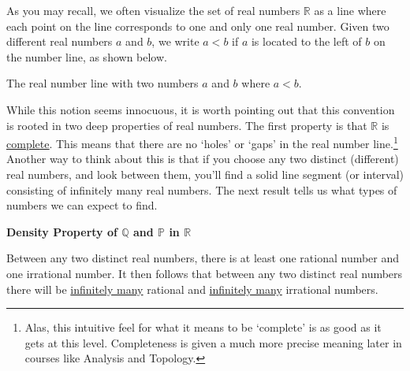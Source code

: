 \documentclass{ximera}
\begin{document}
As you may recall, we often visualize the set of real numbers $\mathbb{R}$ as a line where each point on the line corresponds to one and only one real number.  Given two different real numbers $a$ and $b$,  we write $a < b$ if $a$ is located to the left of $b$ on the number line, as shown below.

\begin{center}

The real number line with two numbers $a$ and $b$ where $a < b$.

\end{center}

While this notion seems innocuous, it is worth pointing out that this convention is rooted in two deep properties of real numbers.  The first property is that $\mathbb{R}$ is  \href{http://en.wikipedia.org/wiki/Complete_metric_space}{\underline{complete}}. This means that there are no `holes' or `gaps' in the real number line.\footnote{Alas, this intuitive feel for what it means to be `complete' is as good as it gets at this level.  Completeness is given a much more precise meaning later in courses like Analysis and Topology.} Another way to think about this is that if you choose any two distinct (different) real numbers, and look between them, you'll find a solid line segment (or interval) consisting of infinitely many real numbers.  The next result tells us what types of numbers we can expect to find.

 

\label{densityofqandp}


\centerline{\textbf{Density Property of $\mathbb{Q}$ and $\mathbb P$ in $\mathbb{R}$}}

Between any two distinct real numbers, there is at least one rational number and one irrational number.  It then follows that between any two distinct real numbers there will be \underline{infinitely many} rational and \underline{infinitely many} irrational numbers.
\end{document}
